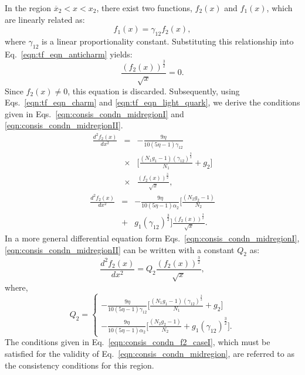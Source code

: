 \documentclass[final,3p,times,twocolumn]{elsarticle}
\begin{document}
            In the region $\overline{x}_{2} < x < x_2$, there exist two functions, $f_2(x)$ and $f_1(x)$, which are linearly related as:  
            \[
            f_1(x) = \gamma_{12} f_2(x),
            \]  
            where $\gamma_{12}$ is a linear proportionality constant. Substituting this relationship into Eq.~\eqref{eqn:tf_eqn_anticharm} yields:  
            \[
            \frac{(f_2(x))^{\frac{3}{2}}}{\sqrt{x}} = 0.
            \]  
            Since $f_2(x) \neq 0$, this equation is discarded. Subsequently, using Eqs.~\eqref{eqn:tf_eqn_charm} and \eqref{eqn:tf_eqn_light_quark}, we derive the conditions given in Eqs.~\eqref{eqn:consis_condn_midregionI} and \eqref{eqn:consis_condn_midregionII}. 
            \begin{eqnarray}
                  \frac{d^2 f_2(x)}{dx^2} &=& -\frac{9\eta}{10(5\eta-1)  \gamma_{12} } \nonumber \\
                  &\times& \biggl[\frac{(N_1 g_1-1)(\gamma_{12})^\frac{3}{2}}{N_1} 
                  + g_2 \biggr] \nonumber \\ 
                  &\times& \frac{\left( f_2(x) \right)^\frac{3}{2}}{\sqrt{x}},
                    \label{eqn:consis_condn_midregionI}
            \end{eqnarray}
            \begin{eqnarray}
                 \frac{d^2 f_2(x)}{dx^2} &=& - \frac{9\eta}{10(5\eta-1)\alpha_2}\biggl[\frac{(N_2 g_2-1)}{N_2}  \nonumber \\
                 &+& g_1 (\gamma_{12})^\frac{3}{2} \biggr]\frac{\left( f_2(x) \right)^\frac{3}{2}}{\sqrt{x}}.
                 \label{eqn:consis_condn_midregionII}
            \end{eqnarray}
            In a more general differential equation form Eqs.~\eqref{eqn:consis_condn_midregionI},  \eqref{eqn:consis_condn_midregionII} can be written with a constant $Q_2$ as: 
            \begin{equation}
                 \frac{d^2f_2(x)}{dx^2} = Q_2 \frac{\left(f_2(x)\right)^\frac{3}{2}}{\sqrt{x}},
                  \label{eqn:consis_condn_midregion}
            \end{equation}
            where, 
            \begin{equation}
            Q_2 = \left\{
                \begin{aligned}     
                    -\frac{9\eta}{10(5\eta-1)  \gamma_{12} }\biggl[\frac{(N_1 g_1-1)(\gamma_{12})^\frac{3}{2}}{N_1} + g_2 \biggr]\\ 
                    -\frac{9\eta}{10(5\eta-1)\alpha_2}\biggl[\frac{(N_2 g_2-1)}{N_2} 
                    + g_1 (\gamma_{12})^\frac{3}{2} \biggr].
                \end{aligned}
                \right. \label{eqn:consis_condn_f2_caseI}
            \end{equation}
            The conditions given in Eq.~\eqref{eqn:consis_condn_f2_caseI}, which must be satisfied for the validity of Eq.~\eqref{eqn:consis_condn_midregion}, are referred to as the consistency conditions for this region. 
\end{document}
